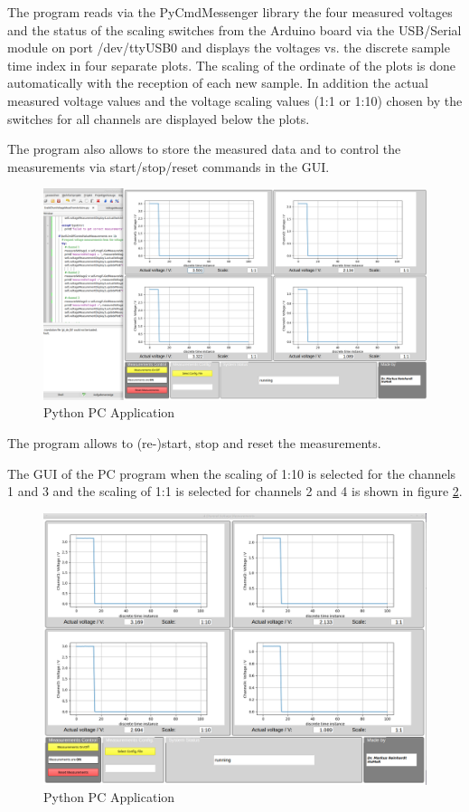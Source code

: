 \documentclass[11pt, oneside]{scrartcl}   	%
\begin{document}
The program reads via the PyCmdMessenger library the four measured voltages and the status of the scaling switches from the Arduino board
via the USB/Serial module on port /dev/ttyUSB0 and displays the voltages vs. the discrete sample time index in four separate plots.
The scaling of the ordinate of the plots is done automatically with the reception of each new sample. 
In addition the actual measured voltage values and the voltage scaling values (1:1 or 1:10) chosen by the switches for all channels are displayed below the plots.

The program also allows to store the measured data and to control the measurements via start/stop/reset commands in the GUI.
\begin{figure}[htbp]
	\centering
	\includegraphics[width=1.0\linewidth]{Figures/ApplicationWindow.png}
	\caption[Python PC Application]{Python PC Application}
	\label{fig:ApplicationWindow}
\end{figure}

The program allows to (re-)start, stop and reset the measurements.

The GUI of the PC program when the scaling of 1:10 is selected for the channels 1 and 3 and the scaling of 1:1 is selected for channels 2 and 4 is shown in figure \ref{fig:ApplicationWindow1}.
\begin{figure}[htbp]
	\centering
	\includegraphics[width=1.0\linewidth]{Figures/ApplicationWindow1.png}
	\caption[Python PC Application]{Python PC Application}
	\label{fig:ApplicationWindow1}
\end{figure}
\end{document}
